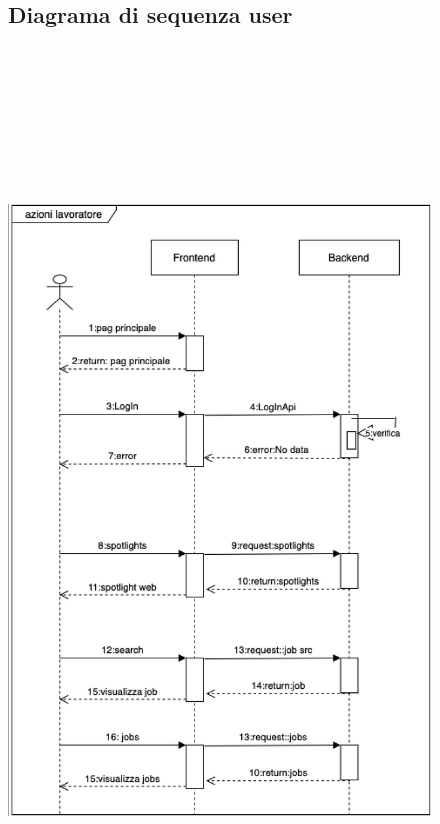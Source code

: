 \documentclass[ 4paper,11pt,openany]{book}
\begin{document}
\begin{figure}[htpb!] 
	\subsection{Diagrama di sequenza user}
	\includegraphics[height=245mm,width=180mm]{Seq_Lavoratore.jpeg}
\end{figure}
\end{document}
